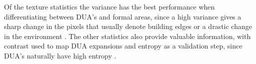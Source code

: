 \documentclass[conference]{IEEEtran}
\begin{document}
		Of the texture statistics the variance has the best performance when differentiating between DUA's and formal areas, since a high variance gives a sharp change in the pixels that usually denote building edges or a drastic change in the environment \cite{Kuffer_2015}.
		The other statistics also provide valuable information, with contrast used to map DUA expansions and entropy as a validation step, since DUA's naturally have high entropy \cite{Kuffer_2016}. 
		
		
%
%
%


%
%




	\nocite{*}
	\printbibliography
	
\end{document}
